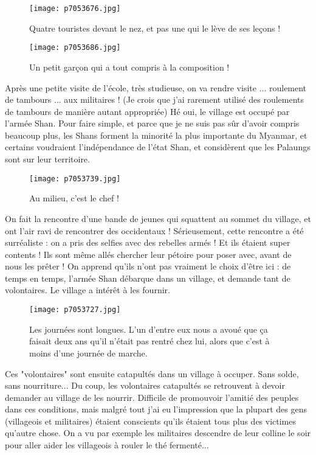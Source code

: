 \documentclass{book}
\begin{document}
\begin{figure}[h]
\centering
\texttt{[image: p7053676.jpg]}
\caption*{Quatre touristes devant le nez, et pas une qui le lève de ses leçons !}
\end{figure}


\begin{figure}[h]
\centering
\texttt{[image: p7053686.jpg]}
\caption*{Un petit garçon qui a tout compris à la composition !}
\end{figure}

Après une petite visite de l'école, très studieuse, on va rendre visite ... roulement de tambours ... aux militaires ! (Je crois que j'ai rarement utilisé des roulements de tambours de manière autant appropriée) Hé oui, le village est occupé par l'armée Shan. Pour faire simple, et parce que je ne suis pas sûr d'avoir compris beaucoup plus, les Shans forment la minorité la plus importante du Myanmar, et certains voudraient l'indépendance de l'état Shan, et considèrent que les Palaungs sont sur leur territoire.


\begin{figure}[h]
\centering
\texttt{[image: p7053739.jpg]}
\caption*{Au milieu, c'est le chef !}
\end{figure}

On fait la rencontre d'une bande de jeunes qui squattent au sommet du village, et ont l'air ravi de rencontrer des occidentaux ! Sérieusement, cette rencontre a été surréaliste : on a pris des selfies avec des rebelles armés ! Et ils étaient super contents ! Ils sont même allés chercher leur pétoire pour poser avec, avant de nous les prêter ! On apprend qu'ils n'ont pas vraiment le choix d'être ici : de temps en temps, l'armée Shan débarque dans un village, et demande tant de volontaires. Le village a intérêt à les fournir.


\begin{figure}[h]
\centering
\texttt{[image: p7053727.jpg]}
\caption*{Les journées sont longues. L'un d'entre eux nous a avoué que ça faisait deux ans qu'il n'était pas rentré chez lui, alors que c'est à moins d'une journée de marche.}
\end{figure}

Ces "volontaires" sont ensuite catapultés dans un village à occuper. Sans solde, sans nourriture... Du coup, les volontaires catapultés se retrouvent à devoir demander au village de les nourrir. Difficile de promouvoir l'amitié des peuples dans ces conditions, mais malgré tout j'ai eu l'impression que la plupart des gens (villageois et militaires) étaient conscients qu'ils étaient tous plus des victimes qu'autre chose. On a vu par exemple les militaires descendre de leur colline le soir pour aller aider les villageois à rouler le thé fermenté...
\end{document}
